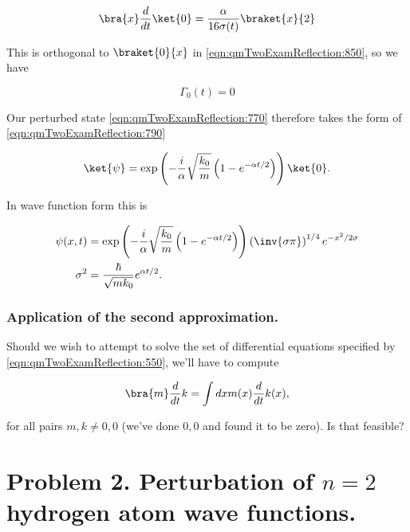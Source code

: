 \begin{equation}\label{eqn:qmTwoExamReflection:910}
\bra{x} \frac{d}{dt} \ket{0} 
=
\frac{\alpha}{16 \sigma(t)} \braket{x}{2}
\end{equation}

This is orthogonal to $\braket{0}{x}$ in \ref{eqn:qmTwoExamReflection:850}, so we have

\begin{equation}\label{eqn:qmTwoExamReflection:930}
\Gamma_0(t) = 0
\end{equation}

Our perturbed state \ref{eqn:qmTwoExamReflection:770} therefore takes the form of \ref{eqn:qmTwoExamReflection:790} 

\begin{equation}\label{eqn:qmTwoExamReflection:950}
\ket{\psi} =
\exp\left(
- \frac{i}{\alpha} \sqrt{\frac{k_0}{m}} 
\left( 1 - e^{-\alpha t/2} \right)
\right) \ket{0}.
\end{equation}

In wave function form this is

\begin{equation}\label{eqn:qmTwoExamReflection:970}
\begin{aligned}
\psi(x, t)
&=
\exp\left(
- \frac{i}{\alpha} \sqrt{\frac{k_0}{m}} 
\left( 1 - e^{-\alpha t/2} \right)
\right) 
\left(\inv{\sigma\pi}\right)^{1/4} e^{- x^2/2 \sigma} \\
\sigma^2 
&= \frac{\hbar}{ \sqrt{m k_0} }
e^{\alpha t/2}.
\end{aligned}
\end{equation}

\subsubsection{Application of the second approximation.}

Should we wish to attempt to solve the set of differential equations specified by \ref{eqn:qmTwoExamReflection:550}, we'll have to compute

\begin{equation}\label{eqn:qmTwoExamReflection:n}
\bra{m} \frac{d}{dt} {k} = \int dx m(x) \frac{d}{dt} k(x),
\end{equation}

for all pairs $m, k \ne 0, 0$ (we've done $0,0$ and found it to be zero).  Is that feasible?

\section{Problem 2.  Perturbation of $n=2$ hydrogen atom wave functions.}

